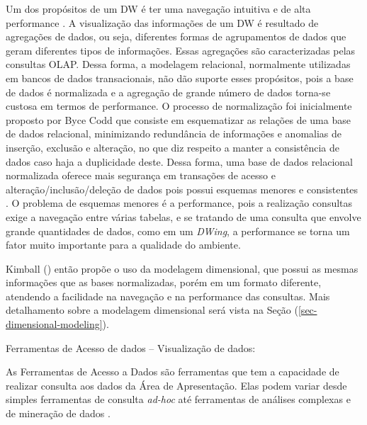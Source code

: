 Um dos propósitos de um DW é ter uma navegação intuitiva e de alta performance \cite{kimball2002}. A visualização das informações de um DW é resultado de agregações de dados, ou seja, diferentes formas de agrupamentos de dados que geram diferentes tipos de informações. Essas agregações são caracterizadas pelas consultas OLAP. Dessa forma, a modelagem relacional, normalmente utilizadas em bancos de dados transacionais, não dão suporte esses propósitos, pois a base de dados é normalizada e a agregação de grande número de dados torna-se custosa em termos de performance. O processo de normalização foi inicialmente proposto por Byce Codd  que consiste em esquematizar as relações de uma base de dados relacional, minimizando redundância de informações e anomalias de inserção, exclusão e alteração, no que diz respeito a manter a consistência de dados caso haja a duplicidade deste. Dessa forma, uma base de dados relacional normalizada oferece mais segurança em transações de acesso e alteração/inclusão/deleção de dados pois possui esquemas menores e consistentes \cite{elmasri2006}. O problema de esquemas menores é a performance, pois a realização consultas exige a navegação  entre várias tabelas, e se tratando de uma consulta que envolve grande quantidades de dados, como em um \emph{DWing}, a performance se torna um fator muito importante para a qualidade do ambiente.

Kimball (\citeyear{kimball2002}) então propõe o uso da modelagem dimensional, que possui as mesmas informações que as bases normalizadas, porém em um formato diferente, atendendo a facilidade na navegação e na performance das consultas. Mais detalhamento sobre a modelagem dimensional será vista na Seção (\ref{sec-dimensional-modeling}).

\begin{description}
\item[Ferramentas de Acesso de dados – Visualização de dados:]
\end{description}

As Ferramentas de Acesso a Dados são ferramentas que tem a capacidade de realizar consulta aos dados da Área de Apresentação. Elas podem variar desde simples ferramentas de consulta \emph{ad-hoc} até ferramentas de análises complexas e de mineração de dados \cite{kimball2002}.

